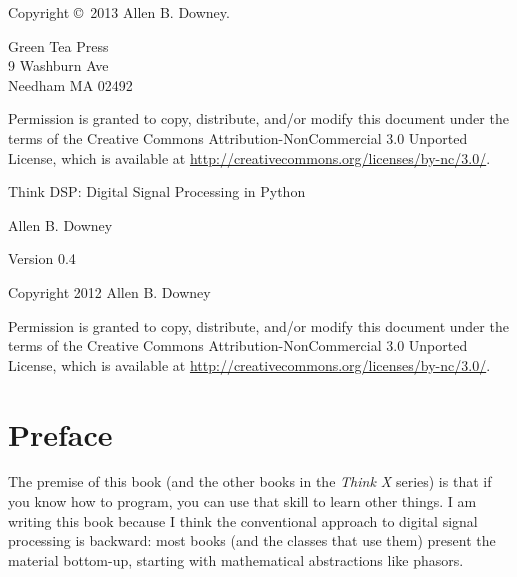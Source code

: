 \documentclass[12pt]{book}
\newcommand{\thetitle}{Think DSP: Digital Signal Processing in Python}
\newcommand{\theversion}{0.4}
\begin{document}
\begin{latexonly}
Copyright \copyright ~2013 Allen B. Downey.


\vspace{0.2in}

\begin{flushleft}
Green Tea Press       \\
9 Washburn Ave \\
Needham MA 02492
\end{flushleft}

Permission is granted to copy, distribute, and/or modify this document
under the terms of the Creative Commons Attribution-NonCommercial 3.0 Unported
License, which is available at \url{http://creativecommons.org/licenses/by-nc/3.0/}.

\vspace{0.2in}

\end{latexonly}



\begin{htmlonly}


{\Large \thetitle}

{\large Allen B. Downey}

Version \theversion

\vspace{0.25in}

Copyright 2012 Allen B. Downey

\vspace{0.25in}

Permission is granted to copy, distribute, and/or modify this document
under the terms of the Creative Commons Attribution-NonCommercial 3.0
Unported License, which is available at
\url{http://creativecommons.org/licenses/by-nc/3.0/}.

\setcounter{chapter}{-1}

\end{htmlonly}

\fi

\chapter{Preface}
\label{preface}

The premise of this book (and the other books in the {\it Think X}
series) is that if you know how to program, you can use that skill to
learn other things.  I am writing this book because I think the
conventional approach to digital signal processing is backward: most
books (and the classes that use them) present the material bottom-up,
starting with mathematical abstractions like phasors.
\end{document}
